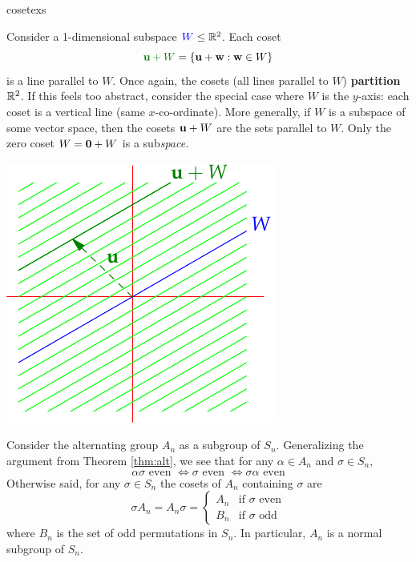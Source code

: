\begin{examples}{}{cosetexs}
\begin{enumerate}
	  
		\begin{minipage}[t]{0.65\linewidth}\vspace{0pt}
			\item\label{ex:cosetsubspace} Consider a 1-dimensional subspace $\textcolor{blue}{W}\le\mathbb{R}^2$. Each coset
			\[
				\textcolor{Green}{\vu+W} =\{\vu+\vw:\vw\in W\}
			\]
			is a line parallel to $W$. Once again, the cosets (all lines parallel to $W$) \textbf{partition} $\mathbb{R}^2$.\smallbreak
			If this feels too abstract, consider the special case where $W$ is the $y$-axis: each coset is a vertical line (same $x$-co-ordinate).\smallbreak
			More generally, if $W$ is a subspace of some vector space, then the cosets ${\mathbf{u}}+W$ are the sets parallel to $W$. Only the zero coset $W=\mathbf{0}+W$ is a sub\emph{space.}
		\end{minipage}
		\hfill
		\begin{minipage}[t]{0.33\linewidth}\vspace{0pt}
			\flushright\includegraphics[scale=0.93]{coset-coset}
		\end{minipage}
	
	
		\item Consider the alternating group $A_n$ as a subgroup of $S_n$. Generalizing the argument from Theorem \ref{thm:alt}, we see that for any $\alpha\in A_n$ and $\sigma\in S_n$,
		\[
			\alpha\sigma\text{ even }
			\iff \sigma\text{ even }
			\iff \sigma\alpha\text{ even}
		\]
		Otherwise said, for any $\sigma\in S_n$ the cosets of $A_n$ containing $\sigma$ are
		\[
			\sigma A_n=A_n\sigma=
			\begin{cases}
				A_n&\text{if $\sigma$ even}\\
				B_n&\text{if $\sigma$ odd}
			\end{cases}
		\]
		where $B_n$ is the set of odd permutations in $S_n$. In particular, $A_n$ is a normal subgroup of $S_n$.
	\end{enumerate}
\end{examples}



